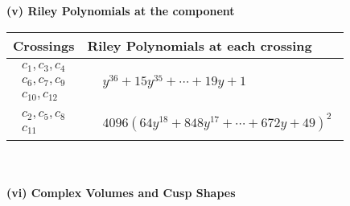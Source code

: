 \documentclass[1p]{elsarticle_modified}
\theoremstyle{definition}
\begin{document}
\newpage\renewcommand{\arraystretch}{1}
\flushleft \textbf{(v) Riley Polynomials at the component}\newline \\
\begin{tabular}{m{50pt}|m{274pt}}
Crossings & \hspace{64pt}Riley Polynomials at each crossing \\
\hline $$\begin{aligned}c_{1},c_{3},c_{4}\\c_{6},c_{7},c_{9}\\c_{10},c_{12}\end{aligned}$$&$\begin{aligned}
&y^{36}+15 y^{35}+\cdots+19 y+1
\end{aligned}$\\
\hline $$\begin{aligned}c_{2},c_{5},c_{8}\\c_{11}\end{aligned}$$&$\begin{aligned}
&4096(64 y^{18}+848 y^{17}+\cdots+672 y+49)^{2}
\end{aligned}$\\
\hline
\end{tabular}\\~\\
\newpage\flushleft \textbf{(vi) Complex Volumes and Cusp Shapes}
\end{document}
